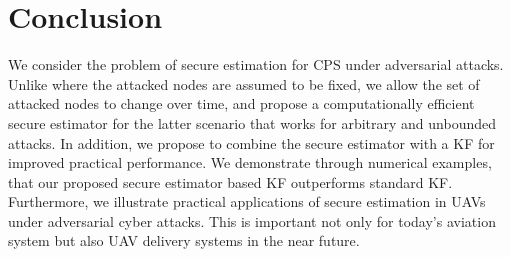 \documentclass[../../thesis.tex]{subfiles}
\begin{document}
\section{Conclusion}
We consider the problem of secure estimation for CPS under adversarial attacks. Unlike \cite{Fawzi2014} where the attacked nodes are assumed to be fixed, we allow the set of attacked nodes to change over time, and propose a computationally efficient secure estimator for the latter scenario that works for arbitrary and unbounded attacks. In addition, we propose to combine the secure estimator with a KF for improved practical performance. We demonstrate through numerical examples, that our proposed secure estimator based KF outperforms standard KF. Furthermore, we illustrate practical applications of secure estimation in UAVs under adversarial cyber attacks. This is important not only for today's aviation system but also UAV delivery systems in the near future. 
                                 
\end{document}
